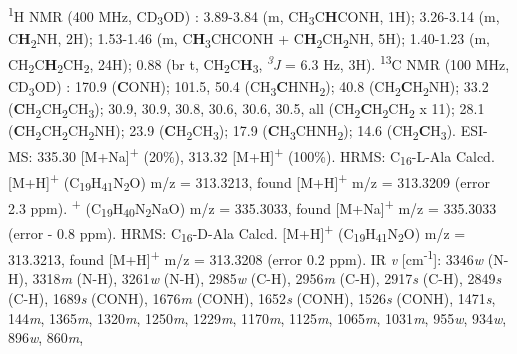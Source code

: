 \textsuperscript{1}H NMR (400 MHz, CD\textsubscript{3}OD) \textdelta :
3.89-3.84 (m, CH\textsubscript{3}C\textbf{H}CONH, 1H); 3.26-3.14 (m, C\textbf{H}\textsubscript{2}NH, 2H); 1.53-1.46 (m, C\textbf{H}\textsubscript{3}CHCONH + C\textbf{H}\textsubscript{2}CH\textsubscript{2}NH, 5H); 1.40-1.23 (m, CH\textsubscript{2}C\textbf{H}\textsubscript{2}CH\textsubscript{2}, 24H); 0.88 (br t, CH\textsubscript{2}C\textbf{H}\textsubscript{3}, \textit{\textsuperscript{3}J} = 6.3 Hz, 3H).
\newline
\textsuperscript{13}C NMR (100 MHz, CD\textsubscript{3}OD) \textdelta: 170.9 (\textbf{C}ONH); 101.5, 50.4 (CH\textsubscript{3}\textbf{C}HNH\textsubscript{2}); 40.8 (CH\textsubscript{2}\textbf{C}H\textsubscript{2}NH); 33.2 (\textbf{C}H\textsubscript{2}CH\textsubscript{2}CH\textsubscript{3}); 30.9, 30.9,  30.8, 30.6, 30.6,  30.5, all (CH\textsubscript{2}\textbf{C}H\textsubscript{2}CH\textsubscript{2} x 11); 28.1 (\textbf{C}H\textsubscript{2}CH\textsubscript{2}CH\textsubscript{2}NH); 23.9 (\textbf{C}H\textsubscript{2}CH\textsubscript{3}); 17.9 (\textbf{C}H\textsubscript{3}CHNH\textsubscript{2}); 14.6 (CH\textsubscript{2}\textbf{C}H\textsubscript{3}). 
\newline
ESI-MS: 335.30 [M+Na]\textsuperscript{+} (20\%), 313.32 [M+H]\textsuperscript{+} (100\%).
\newline
HRMS: C\textsubscript{16}-L-Ala Calcd. 
[M+H]\textsuperscript{+} (C\textsubscript{19}H\textsubscript{41}N\textsubscript{2}O) m/z = 313.3213, found [M+H]\textsuperscript{+} m/z = 313.3209 (error 2.3 ppm).
\newline
[M+Na]\textsuperscript{+} (C\textsubscript{19}H\textsubscript{40}N\textsubscript{2}NaO) m/z = 335.3033, found [M+Na]\textsuperscript{+} m/z = 335.3033 (error - 0.8 ppm).
\newline
HRMS: C\textsubscript{16}-D-Ala  Calcd. [M+H]\textsuperscript{+} (C\textsubscript{19}H\textsubscript{41}N\textsubscript{2}O) m/z = 313.3213, found [M+H]\textsuperscript{+} m/z = 313.3208 (error 0.2 ppm).
\newline
IR \textit{v} [cm\textsuperscript{-1}]:  3346\textit{w} (N-H), 3318\textit{m} (N-H), 3261\textit{w} (N-H), 2985\textit{w} (C-H), 2956\textit{m} (C-H), 2917\textit{s} (C-H), 2849\textit{s} (C-H), 1689\textit{s} (CONH), 1676\textit{m} (CONH), 1652\textit{s} (CONH), 1526\textit{s} (CONH), 1471\textit{s}, 144\textit{m}, 1365\textit{m}, 1320\textit{m}, 1250\textit{m}, 1229\textit{m}, 1170\textit{m}, 1125\textit{m}, 1065\textit{m}, 1031\textit{m}, 955\textit{w}, 934\textit{w}, 896\textit{w}, 860\textit{m},
\newpage
